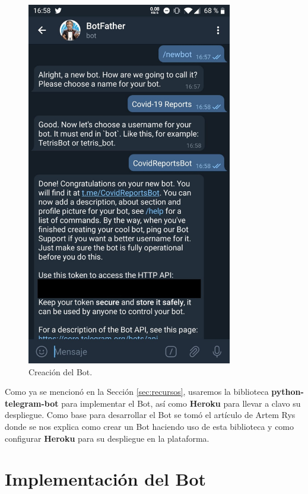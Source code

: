 \begin{figure}[p]
	\centering
	\includegraphics[width=0.8\textwidth]{img/crear-bot-2}
	\caption{Creación del Bot.}
	\label{fig:crear-bot-2}
\end{figure}

Como ya se mencionó en la Sección \ref{sec:recursos}, usaremos la biblioteca \textbf{python-telegram-bot} para implementar el Bot, así como \textbf{Heroku} para llevar a clavo su despliegue. Como base para desarrollar el Bot se tomó el artículo de Artem Rys \cite{crear-bot-heroku} donde se nos explica como crear un Bot haciendo uso de esta biblioteca y como configurar \textbf{Heroku} para su despliegue en la plataforma.

\section{Implementación del Bot}

